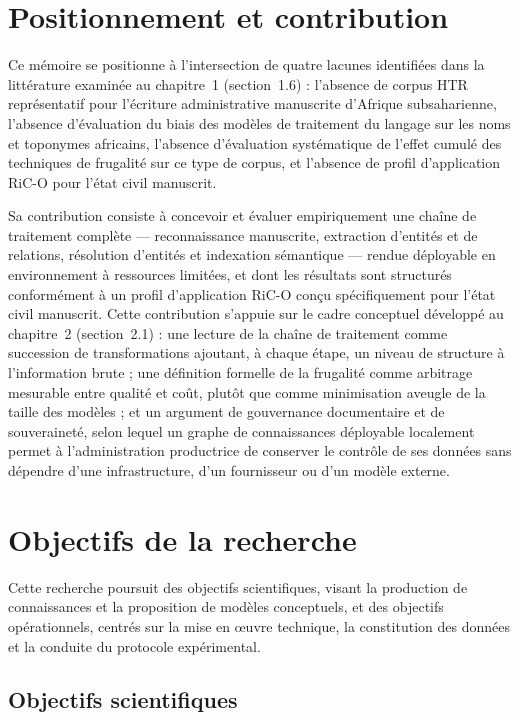 \section*{Positionnement et contribution}

Ce mémoire se positionne à l'intersection de quatre lacunes identifiées dans la littérature examinée au chapitre~1 (section~1.6) : l'absence de corpus HTR représentatif pour l'écriture administrative manuscrite d'Afrique subsaharienne, l'absence d'évaluation du biais des modèles de traitement du langage sur les noms et toponymes africains, l'absence d'évaluation systématique de l'effet cumulé des techniques de frugalité sur ce type de corpus, et l'absence de profil d'application RiC-O pour l'état civil manuscrit.

Sa contribution consiste à concevoir et évaluer empiriquement une chaîne de traitement complète --- reconnaissance manuscrite, extraction d'entités et de relations, résolution d'entités et indexation sémantique --- rendue déployable en environnement à ressources limitées, et dont les résultats sont structurés conformément à un profil d'application RiC-O conçu spécifiquement pour l'état civil manuscrit.
Cette contribution s'appuie sur le cadre conceptuel développé au chapitre~2 (section~2.1) : une lecture de la chaîne de traitement comme succession de transformations ajoutant, à chaque étape, un niveau de structure à l'information brute ; une définition formelle de la frugalité comme arbitrage mesurable entre qualité et coût, plutôt que comme minimisation aveugle de la taille des modèles ; et un argument de gouvernance documentaire et de souveraineté, selon lequel un graphe de connaissances déployable localement permet à l'administration productrice de conserver le contrôle de ses données sans dépendre d'une infrastructure, d'un fournisseur ou d'un modèle externe.

\section*{Objectifs de la recherche}

Cette recherche poursuit des objectifs scientifiques, visant la production de connaissances et la proposition de modèles conceptuels, et des objectifs opérationnels, centrés sur la mise en œuvre technique, la constitution des données et la conduite du protocole expérimental.

\subsection*{Objectifs scientifiques}

